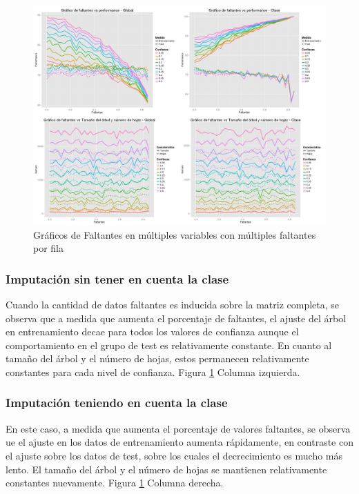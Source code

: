 \documentclass[]{article}
\begin{document}
\begin{figure}[H]
	\includegraphics[scale = 0.27]{2_1_Mult_Col_Mult_Fil}
	\caption[[Faltantes Múltiples variables Múltiples Filas]{Gráficos de Faltantes en múltiples variables con múltiples faltantes por fila}
	\label{1.P2MultVarMultFil}
\end{figure}

\subsubsection{Imputación sin tener en cuenta la clase}
Cuando la cantidad de datos faltantes es inducida sobre la matriz completa, se observa que a medida que aumenta el porcentaje de faltantes, el ajuste del árbol en entrenamiento decae para todos los valores de confianza aunque el comportamiento en el grupo de test es relativamente constante. En cuanto al tamaño del árbol y el número de hojas, estos permanecen relativamente constantes para cada nivel de confianza. Figura \ref{1.P2MultVarMultFil} Columna izquierda.

\subsubsection{Imputación teniendo en cuenta la clase}
En este caso, a medida que aumenta el porcentaje de valores faltantes, se observa ue el ajuste en los datos de entrenamiento aumenta rápidamente, en contraste con el ajuste sobre los datos de test, sobre los cuales el decrecimiento es mucho más lento. El tamaño del árbol y el número de hojas se mantienen relativamente constantes nuevamente. Figura \ref{1.P2MultVarMultFil} Columna derecha.
\end{document}
